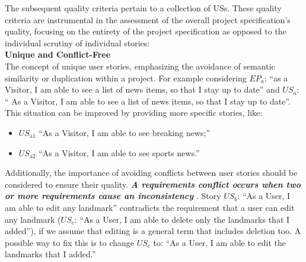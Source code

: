 The subsequent quality criteria pertain to a collection of USs. These quality criteria are instrumental in the assessment of the overall project specification's quality, focusing on the entirety of the project specification as opposed to the individual scrutiny of individual stories: \\ 
\textbf{Unique and Conﬂict-Free}\\ 
The concept of unique user stories, emphasizing the avoidance of semantic similarity or duplication within a project. For example considering $EP_a$: \enquote{as a Visitor, I am able to see a list of news items, so that I stay up to date} and $US_a$: \enquote{ As a Visitor, I am able to see a list of news items, so that I stay up to date}. This situation can be improved by providing more specific stories, like:
\begin{itemize}
\item $US_{\text{a1}}$ \enquote{As a Visitor, I am able to see breaking news;}
\item $US_{\text{a2}}$ \enquote{As a Visitor, I am able to see sports news.}
\end{itemize}
Additionally, the importance of avoiding conflicts between user stories should be considered to ensure their quality. \textbf{\emph{A requirements conflict occurs when two or more requirements cause an inconsistency}} \cite{paja2013managing} \cite{robinson1989integrating}. Story $US_b$: \enquote{As a User, I am able to edit any landmark} contradicts the requirement that a user can edit any landmark ($US_c$: \enquote{As a User, I am able to delete only the landmarks that I added}), if we assume that editing is a general term that includes deletion too. A possible way to fix this is to change $US_c$ to: \enquote{As a User, I am able to edit the landmarks that I added.} \cite{lucassen2016improving}

